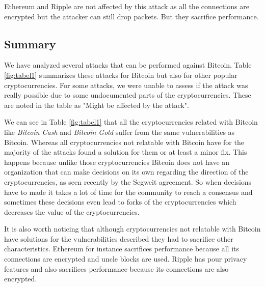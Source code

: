 Ethereum and Ripple are not affected by this attack as all the connections are encrypted but the attacker can still drop packets. But they sacrifice performance.


\subsection{Summary}
We have analyzed several attacks that can be performed against Bitcoin. Table \ref{fig:tabel1} summarizes these attacks for Bitcoin but also for other popular cryptocurrencies. For some attacks, we were unable to assess if the attack was really possible due to some undocumented parts of the cryptocurrencies. These are noted in the table as "Might be affected by the attack".

We can see in Table \ref{fig:tabel1} that all the cryptocurrencies related with Bitcoin like \textit{Bitcoin Cash} and \textit{Bitcoin Gold} suffer from the same vulnerabilities as Bitcoin. Whereas all cryptocurrencies not relatable with Bitcoin have for the majority of the attacks found a solution for them or at least a minor fix. This happens because unlike those cryptocurrencies Bitcoin does not have an organization that can make decisions on its own regarding the direction of the cryptocurrencies, as seen recently by the Segweit agreement. So when decisions have to made it takes a lot of time for the community to reach a consensus and sometimes these decisions even lead to forks of the cryptocurrencies which decreases the value of the cryptocurrencies.

It is also worth noticing that although cryptocurrencies not relatable with Bitcoin have solutions for the vulnerabilities described they had to sacrifice other characteristics. Ethereum for instance sacrifices performance because all its connections are encrypted and uncle blocks are used. Ripple has pour privacy features and also sacrifices performance because its connections are also encrypted.

